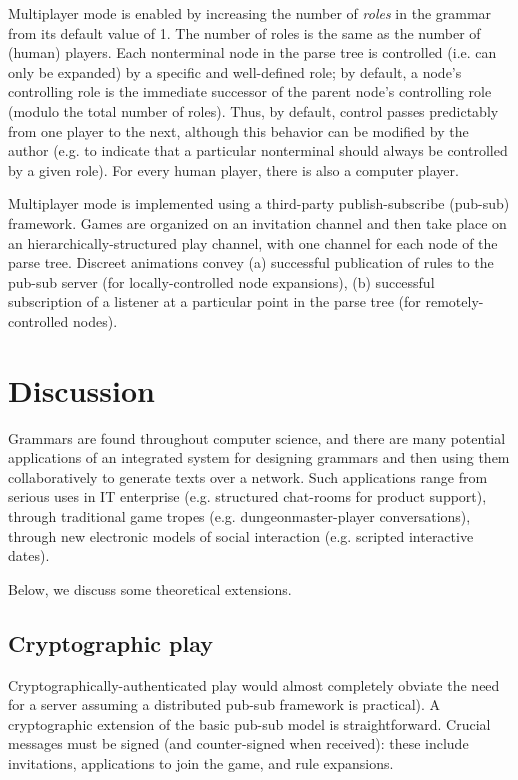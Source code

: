 \documentclass{acm_proc_article-sp}
\begin{document}
Multiplayer mode is enabled by increasing the number of {\em roles} in the grammar from its default value of 1.
The number of roles is the same as the number of (human) players.
Each nonterminal node in the parse tree is controlled (i.e. can only be expanded) by a specific and well-defined role;
by default, a node's controlling role is the immediate successor of the parent node's controlling role
(modulo the total number of roles).
Thus, by default, control passes predictably from one player to the next,
although this behavior can be modified by the author (e.g. to indicate that a particular nonterminal
should always be controlled by a given role).
For every human player, there is also a computer player.

Multiplayer mode is implemented using a third-party publish-subscribe (pub-sub) framework.
Games are organized on an invitation channel and then take place on an hierarchically-structured
play channel, with one channel for each node of the parse tree.
Discreet animations convey
 (a) successful publication of rules to the pub-sub server (for locally-controlled node expansions),
 (b) successful subscription of a listener at a particular point in the parse tree (for remotely-controlled nodes).

\section{Discussion}

Grammars are found throughout computer science,
and there are many potential applications of an
integrated system for designing grammars and then using them collaboratively to generate texts over a network.
Such applications range from
serious uses in IT enterprise (e.g. structured chat-rooms for product support),
through traditional game tropes (e.g. dungeonmaster-player conversations),
through new electronic models of social interaction (e.g. scripted interactive dates).

Below, we discuss some theoretical extensions.

\subsection{Cryptographic play}

Cryptographically-authenticated play would almost completely obviate the need for a server
assuming a distributed pub-sub framework is practical).
A cryptographic extension of the basic pub-sub model is straightforward.
Crucial messages must be signed (and counter-signed when received):
these include invitations, applications to join the game, and rule expansions.
\end{document}
